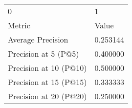 \begin{tabular}{ll}
0 & 1 \\
Metric & Value \\
Average Precision & 0.253144 \\
Precision at 5 (P@5) & 0.400000 \\
Precision at 10 (P@10) & 0.500000 \\
Precision at 15 (P@15) & 0.333333 \\
Precision at 20 (P@20) & 0.250000 \\
\end{tabular}
